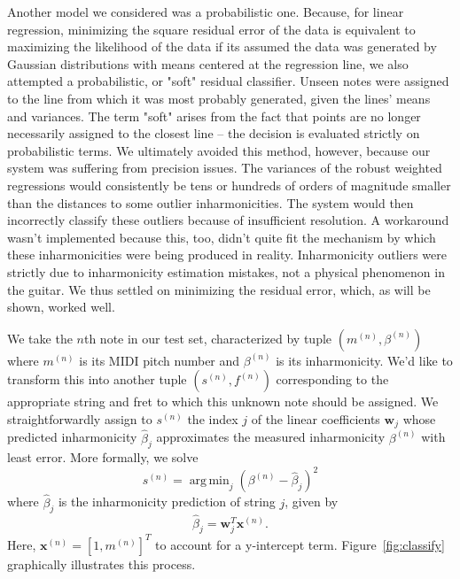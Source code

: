 \documentclass[12pt]{cmuthesis}
\DeclareMathOperator*{\argmin}{arg\,min}
\begin{document}
Another model we considered was a probabilistic one. Because, for linear regression, minimizing the square residual error of the data is equivalent to maximizing the likelihood of the data if its assumed the data was generated by Gaussian distributions with means centered at the regression line, we also attempted a probabilistic, or "soft" residual classifier. Unseen notes were assigned to the line from which it was most probably generated, given the lines' means and variances. The term "soft" arises from the fact that points are no longer necessarily assigned to the closest line -- the decision is evaluated strictly on probabilistic terms. We ultimately avoided this method, however, because our system was suffering from precision issues. The variances of the robust weighted regressions would consistently be tens or hundreds of orders of magnitude smaller than the distances to some outlier inharmonicities. The system would then incorrectly classify these outliers because of insufficient resolution. A workaround wasn't implemented because this, too, didn't quite fit the mechanism by which these inharmonicities were being produced in reality. Inharmonicity outliers were strictly due to inharmonicity estimation mistakes, not a physical phenomenon in the guitar. We thus settled on minimizing the residual error, which, as will be shown, worked well.

We take the $n$th note in our test set, characterized by tuple $(m^{(n)},\beta^{(n)})$ where $m^{(n)}$ is its MIDI pitch number and $\beta^{(n)}$ is its inharmonicity. We'd like to transform this into another tuple $(s^{(n)},f^{(n)})$ corresponding to the appropriate string and fret to which this unknown note should be assigned. We straightforwardly assign to $s^{(n)}$ the index $j$ of the linear coefficients $\mathbf{w}_j$ whose predicted inharmonicity $\hat\beta_j$ approximates the measured inharmonicity $\beta^{(n)}$ with least error. More formally, we solve 
\begin{equation}
\label{eq:classify}
s^{(n)} = \argmin_{j}{(\beta^{(n)} - \hat{\beta}_{j})^2}
\end{equation}
where $\hat\beta_j$ is the inharmonicity prediction of string $j$, given by
\begin{equation}
\hat{\beta}_{j} = \mathbf{w}_{j}^T\mathbf{x}^{(n)}.
\end{equation}
Here, $\mathbf{x}^{(n)} = [1, m^{(n)}]^T$ to account for a y-intercept term. Figure~\ref{fig:classify} graphically illustrates this process.
\end{document}
